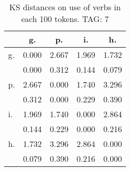 \begin{table}[h!]
\begin{center}
\begin{tabular}{| l | c | c | c | c |}\hline
 & g. & p. & i. & h. \\\hline
g. & 0.000  & 2.667  & 1.969  & 1.732 \\\hline
 & 0.000  & 0.312  & 0.144  & 0.079 \\\hline
p. & 2.667  & 0.000  & 1.740  & 3.296 \\\hline
 & 0.312  & 0.000  & 0.229  & 0.390 \\\hline
i. & 1.969  & 1.740  & 0.000  & 2.864 \\\hline
 & 0.144  & 0.229  & 0.000  & 0.216 \\\hline
h. & 1.732  & 3.296  & 2.864  & 0.000 \\\hline
 & 0.079  & 0.390  & 0.216  & 0.000 \\\hline
\end{tabular}
\caption{KS distances on use of verbs in each 100 tokens. TAG: 7}
\end{center}
\end{table}
